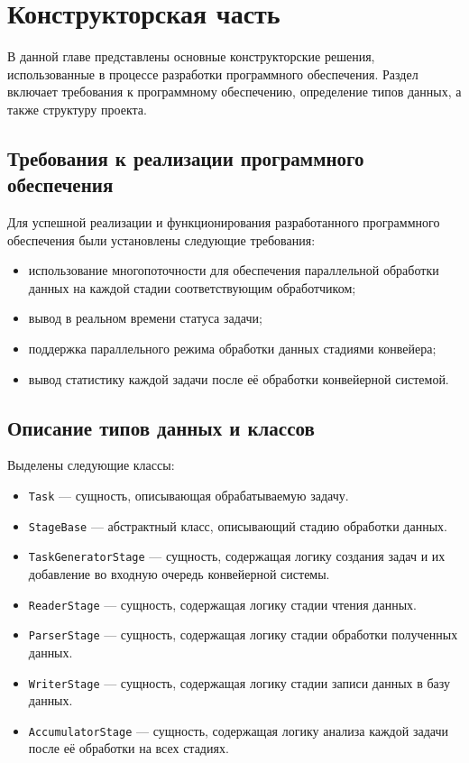 \chapter{Конструкторская часть}
В данной главе представлены основные конструкторские решения, использованные в процессе разработки программного обеспечения. Раздел включает требования к программному обеспечению, определение типов данных, а также структуру проекта.

\section{Требования к реализации программного обеспечения}
Для успешной реализации и функционирования разработанного программного обеспечения были установлены следующие требования:
\begin{itemize}[label=---]
	\item использование многопоточности для обеспечения параллельной обработки данных на каждой стадии соответствующим обработчиком;
	\item вывод в реальном времени статуса задачи;
	\item поддержка параллельного режима обработки данных стадиями конвейера;
	\item вывод статистику каждой задачи после её обработки конвейерной системой.
\end{itemize}

\section{Описание типов данных и классов}
Выделены следующие классы:
\begin{itemize}[label=---]
	\item \texttt{Task} --- сущность, описывающая обрабатываемую задачу.
	\item \texttt{StageBase} --- абстрактный класс, описывающий стадию обработки данных.
	\item \texttt{TaskGeneratorStage} --- сущность, содержащая логику создания задач и их добавление во входную очередь конвейерной системы.
	\item \texttt{ReaderStage} --- сущность, содержащая логику стадии чтения данных.
	\item \texttt{ParserStage} --- сущность, содержащая логику стадии обработки полученных данных.
	\item \texttt{WriterStage} --- сущность, содержащая логику стадии записи данных в базу данных.
	\item \texttt{AccumulatorStage} --- сущность, содержащая логику анализа каждой задачи после её обработки на всех стадиях.
\end{itemize}

